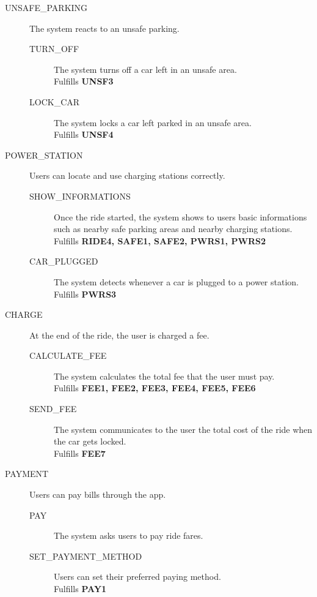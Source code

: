 \documentclass[11pt]{article} %
\begin{document}
\begin{description}
	\item[UNSAFE\_PARKING] The system reacts to an unsafe parking.\hfill {\color{red}{Missing UNSF1, UNSF2}}
		\begin{description}
			\item[TURN\_OFF] The system turns off a car left in an unsafe area. \\ Fulfills \textbf{UNSF3}
			\item[LOCK\_CAR] The system locks a car left parked in an unsafe area. \\ Fulfills \textbf{UNSF4}
		\end{description}

	\item[POWER\_STATION] Users can locate and use charging stations correctly. \hfill {\color{red}{Missing PWRS4}}
		\begin{description}
			\item[SHOW\_INFORMATIONS] Once the ride started, the system shows to users basic informations such as nearby safe parking areas and nearby charging stations. \\ Fulfills \textbf{RIDE4, SAFE1, SAFE2, PWRS1, PWRS2}
			\item[CAR\_PLUGGED] The system detects whenever a car is plugged to a power station. \\ Fulfills \textbf{PWRS3}
		\end{description}

	\item[CHARGE] At the end of the ride, the user is charged a fee.\hfill
		\begin{description}
			\item[CALCULATE\_FEE] The system calculates the total fee that the user must pay. \\ Fulfills \textbf{FEE1, FEE2, FEE3, FEE4, FEE5, FEE6}
			\item[SEND\_FEE] The system communicates to the user the total cost of the ride when the car gets locked. \\ Fulfills \textbf{FEE7}
		\end{description}

	\item[PAYMENT] Users can pay bills through the app.\hfill {\color{red}{Missing PAY2, PAY3, PAY4}}
		\begin{description}
			\item[PAY] The system asks users to pay ride fares. {\color{red}{No matching req. found .-.}}
			\item[SET\_PAYMENT\_METHOD] Users can set their preferred paying method. \\ Fulfills \textbf{PAY1}
		\end{description}


\end{description}
\end{document}
